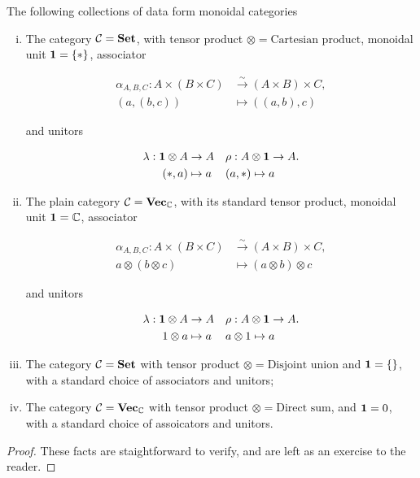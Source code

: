 \begin{prop} The following collections of data form monoidal categories

\begin{enumerate}[(i)]
\item The category ${\mathcal C}={\bf Set}$, with tensor product $\otimes = \text{Cartesian product}$, monoidal unit ${\mathbf 1} =\{*\}$, associator

\begin{align*}
\alpha_{A,B,C}: A\times (B\times C) &\xrightarrow{\sim}(A\times B)\times C,\\
(a,(b,c))&\mapsto ((a,b),c)
\end{align*}

and unitors 

\begin{align*}
\lambda: {\mathbf 1} \otimes A &\to A && \rho:  A\otimes {\mathbf 1} \to A.\\
(*, a)&\mapsto a && (a,*)\mapsto a
\end{align*}

\item The plain category ${\mathcal C}={\bf Vec}_{{\mathbb C}}$, with its standard tensor product, monoidal unit ${\mathbf 1} ={\mathbb C}$, associator

\begin{align*}
\alpha_{A,B,C}: A\times (B\times C) &\xrightarrow{\sim}(A\times B)\times C,\\
a\otimes (b\otimes c ) & \mapsto (a\otimes b)\otimes c
\end{align*}

and unitors 

\begin{align*}
\lambda: {\mathbf 1} \otimes A &\to A && \rho:  A\otimes {\mathbf 1} \to A.\\
1\otimes a &\mapsto  a && a\otimes 1 \mapsto a
\end{align*}

\item The category ${\mathcal C}={\bf Set}$ with tensor product $\otimes=\text{Disjoint union}$ and ${\mathbf 1}=\{\}$, with a standard choice of associators and unitors;

\item The category ${\mathcal C}={\bf Vec}_{{\mathbb C}}$ with tensor product $\otimes = \text{Direct sum}$, and ${\mathbf 1} = 0$, with a standard choice of assoicators and unitors.
\end{enumerate}


\end{prop}
\begin{proof} These facts are staightforward to verify, and are left as an exercise to the reader.
\end{proof}

